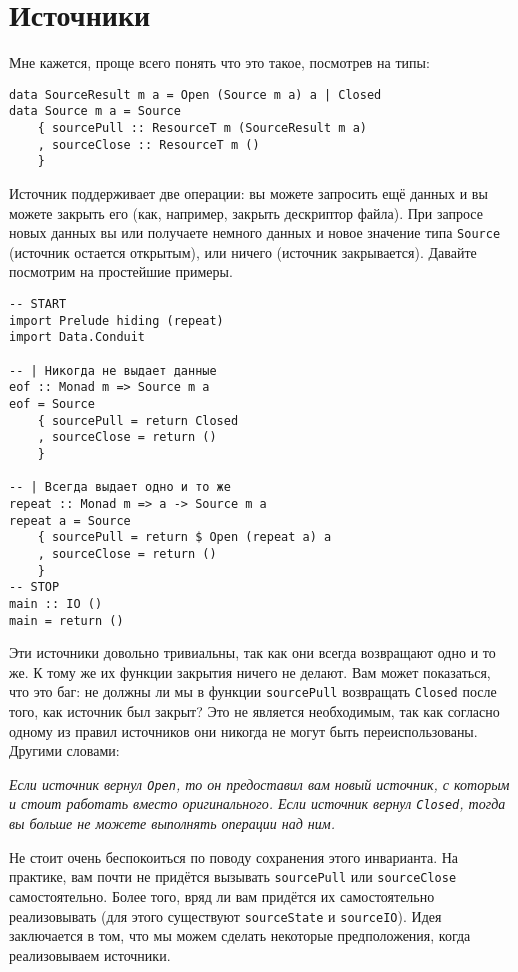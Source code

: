 {\section{Источники}

Мне кажется, проще всего понять что это такое, посмотрев на типы:
\begin{lstlisting}
data SourceResult m a = Open (Source m a) a | Closed
data Source m a = Source
    { sourcePull :: ResourceT m (SourceResult m a)
    , sourceClose :: ResourceT m ()
    }
\end{lstlisting}
Источник поддерживает две операции: вы можете запросить ещё данных и вы можете закрыть его (как,
например, закрыть дескриптор файла). При запросе новых данных вы или получаете немного
данных и новое  значение типа \lstinline=Source= (источник остается открытым), или
ничего (источник закрывается). Давайте посмотрим на простейшие примеры.
\begin{lstlisting}
-- START
import Prelude hiding (repeat)
import Data.Conduit

-- | Никогда не выдает данные
eof :: Monad m => Source m a
eof = Source
    { sourcePull = return Closed
    , sourceClose = return ()
    }

-- | Всегда выдает одно и то же
repeat :: Monad m => a -> Source m a
repeat a = Source
    { sourcePull = return $ Open (repeat a) a
    , sourceClose = return ()
    }
-- STOP
main :: IO ()
main = return ()
\end{lstlisting}
Эти источники довольно тривиальны, так как они всегда возвращают одно и то же. К тому
же их функции закрытия ничего не делают. Вам может показаться, что это баг: не должны ли 
мы в функции \lstinline=sourcePull= возвращать \lstinline=Closed= после того, как
источник был
закрыт? Это не является необходимым, так как согласно одному из правил
источников они никогда не могут быть переиспользованы. Другими словами:
    
\textit{Если источник вернул \lstinline=Open=, то он предоставил вам новый источник, с
которым и
стоит работать вместо оригинального. Если источник вернул \lstinline=Closed=, тогда вы
больше не можете выполнять операции над ним.}
    
Не стоит очень беспокоиться по поводу сохранения этого инварианта. На практике, вам почти
не придётся вызывать \lstinline=sourcePull= или \lstinline=sourceClose= самостоятельно.
Более того, вряд ли вам придётся их самостоятельно реализовывать (для этого существуют
\lstinline=sourceState= и \lstinline=sourceIO=).
Идея заключается в том, что мы можем сделать некоторые предположения, когда реализовываем
источники.

}
